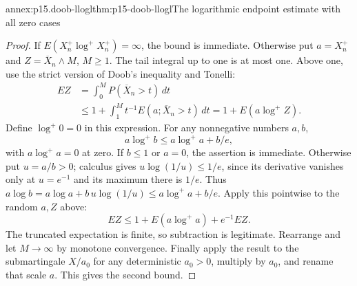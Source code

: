 \begin{annexitem}{annex:p15.doob-llogl}{thm:p15-doob-llogl}{The logarithmic endpoint estimate with all zero cases}
\begin{proof}
If \(E(X_n^+\log^+X_n^+)=\infty\), the bound is immediate.
Otherwise put \(a=X_n^+\) and \(Z=\overline X_n\wedge M\), \(M\geq1\).
The tail integral up to one is at most one.
Above one, use the strict version of Doob's inequality and Tonelli:
\[
 \begin{aligned}
 EZ&=\int_0^MP(\overline X_n>t)\,dt\\
   &\leq1+\int_1^M t^{-1}E(a;\overline X_n>t)\,dt
    =1+E(a\log^+Z).
 \end{aligned}
\]
Define \(\log^+0=0\) in this expression.
For any nonnegative numbers \(a,b\),
\[
                           a\log^+b\leq a\log^+a+b/e,
\]
with \(a\log^+a=0\) at zero. If \(b\leq1\) or \(a=0\),
the assertion is immediate. Otherwise put \(u=a/b>0\);
calculus gives \(u\log(1/u)\leq1/e\), since its derivative
vanishes only at \(u=e^{-1}\) and its maximum there is \(1/e\).
Thus
\(a\log b=a\log a+b\,u\log(1/u)\leq a\log^+a+b/e\).
Apply this pointwise to the random \(a,Z\) above:
\[
                         EZ\leq1+E(a\log^+a)+e^{-1}EZ.
\]
The truncated expectation is finite, so subtraction is legitimate.
Rearrange and let \(M\to\infty\) by monotone convergence.
Finally apply the result to the submartingale \(X/a_0\) for
any deterministic \(a_0>0\), multiply by \(a_0\), and rename
that scale \(a\). This gives the second bound.
\end{proof}
\end{annexitem}

